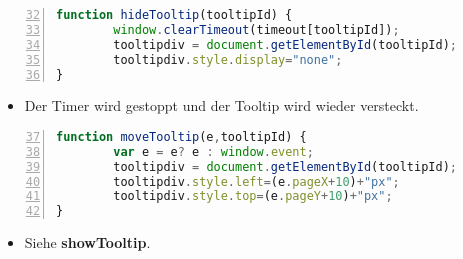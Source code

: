 \begin{frame}[<+->][fragile]
\tiny{\begin{lstlisting}[language=JavaScript, 
		   numbers=left,
		   numbersep=3pt,
		   breaklines=true,
		   firstnumber=32]		 
function hideTooltip(tooltipId) {
        window.clearTimeout(timeout[tooltipId]);
        tooltipdiv = document.getElementById(tooltipId);
        tooltipdiv.style.display="none";
}
\end{lstlisting}}
\pause
\normalsize
\begin{itemize}
\item Der Timer wird gestoppt und der Tooltip wird wieder versteckt.
\end{itemize}
\end{frame}
\begin{frame}[<+->][fragile]
\tiny{\begin{lstlisting}[language=JavaScript, 
		   numbers=left,
		   numbersep=3pt,
		   breaklines=true,
		   firstnumber=37]		 
function moveTooltip(e,tooltipId) {
        var e = e? e : window.event;
        tooltipdiv = document.getElementById(tooltipId);
        tooltipdiv.style.left=(e.pageX+10)+"px";
        tooltipdiv.style.top=(e.pageY+10)+"px";
}
\end{lstlisting}}
\normalsize
\pause
\begin{itemize}
\item Siehe \textbf{showTooltip}.
\end{itemize}
\end{frame}
